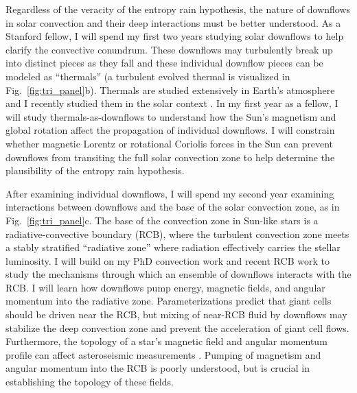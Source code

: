 \documentclass[onecolumn, 11pt, hmargin=1in, vmargin=1in]{aastex62}
\begin{document}
Regardless of the veracity of the entropy rain hypothesis, the nature of downflows in solar convection and their deep interactions must be better understood.
As a Stanford fellow, I will spend my first two years studying solar downflows to help clarify the convective conundrum.
These downflows may turbulently break up into distinct pieces as they fall and these individual downflow pieces can be modeled as ``thermals'' (a turbulent evolved thermal is visualized in Fig.~\ref{fig:tri_panel}b).
Thermals are studied extensively in Earth's atmosphere \citep{lecoanet&jeevanjee2019} and I recently studied them in the solar context \citep{andersLB2019}.
In my first year as a fellow, I will study thermals-as-downflows to understand how the Sun's magnetism and global rotation affect the propagation of individual downflows.
I will constrain whether magnetic Lorentz or rotational Coriolis forces in the Sun can prevent downflows from transiting the full solar convection zone to help determine the plausibility of the entropy rain hypothesis.

After examining individual downflows, I will spend my second year examining interactions between downflows and the base of the solar convection zone, as in Fig.~\ref{fig:tri_panel}c.
The base of the convection zone in Sun-like stars is a radiative-convective boundary (RCB), where the turbulent convection zone meets a stably stratified ``radiative zone'' where radiation effectively carries the stellar luminosity.
I will build on my PhD convection work \citep{anders&brown2017, anders&all2019} and recent RCB work \citep{wood&brummell2018} to study the mechanisms through which an ensemble of downflows interacts with the RCB.
I will learn how downflows pump energy, magnetic fields, and angular momentum into the radiative zone.
Parameterizations predict that giant cells should be driven near the RCB, but mixing of near-RCB fluid by downflows may stabilize the deep convection zone and prevent the acceleration of giant cell flows.
Furthermore, the topology of a star's magnetic field and angular momentum profile can affect asteroseismic measurements \citep{benomar&all2018, santos&all2018}.
Pumping of magnetism and angular momentum into the RCB is poorly understood, but is crucial in establishing the topology of these fields.
\end{document}
